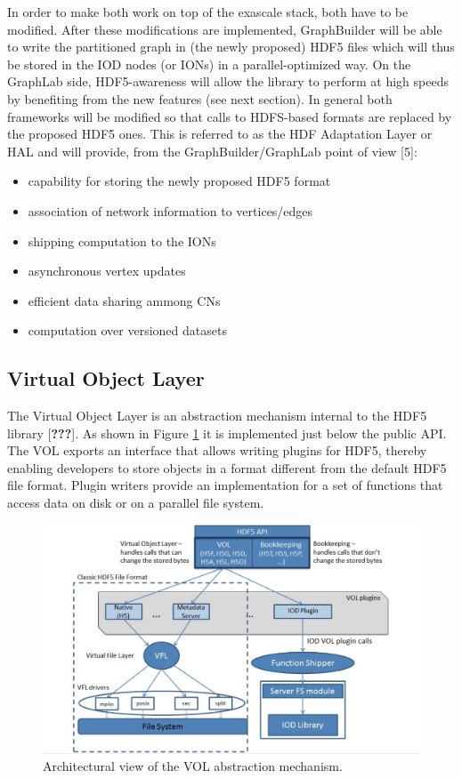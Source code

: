 \documentclass[conference]{IEEEtran}
\begin{document}
In order to make both work on top of the exascale stack, both have to be
modified. After these modifications are implemented, GraphBuilder will
be able to write the partitioned graph in (the newly proposed) HDF5
files which will thus be stored in the IOD nodes (or IONs) in a
parallel-optimized way. On the GraphLab side, HDF5-awareness will allow
the library to perform at high speeds by benefiting from the new
features (see next section). In general both frameworks will be modified
so that calls to HDFS-based formats are replaced by the proposed HDF5
ones. This is referred to as the HDF Adaptation Layer or HAL and will
provide, from the GraphBuilder/GraphLab point of view {[}5{]}:

\begin{itemize}
\itemsep1pt\parskip0pt
\item
  capability for storing the newly proposed HDF5 format
\item
  association of network information to vertices/edges
\item
  shipping computation to the IONs
\item
  asynchronous vertex updates
\item
  efficient data sharing ammong CNs
\item
  computation over versioned datasets
\end{itemize}

\subsection{Virtual Object Layer}\label{virtual-object-layer}

The Virtual Object Layer is an abstraction mechanism internal to the
HDF5 library {[}\textbf{???}{]}. As shown in Figure \ref{vol-arch} it is
implemented just below the public API. The VOL exports an interface that
allows writing plugins for HDF5, thereby enabling developers to store
objects in a format different from the default HDF5 file format. Plugin
writers provide an implementation for a set of functions that access
data on disk or on a parallel file system.

\begin{figure}[htbp]
\centering
\includegraphics[scale=0.20]{images/vol-arch.png}
\caption{Architectural view of the VOL abstraction mechanism.
\label{vol-arch}}
\end{figure}
\end{document}
